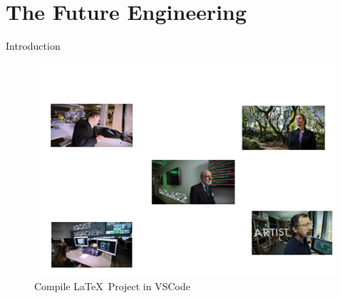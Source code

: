 
\section{The Future Engineering }

{
\begin{frame}{Introduction}
      \begin{figure}
        \centering
        \includegraphics[scale=0.2]{./figs/eng-of-the-future/versions/drawing.png}
        \caption{Compile \LaTeX~Project in VSCode}
      \end{figure}

\end{frame}
}


